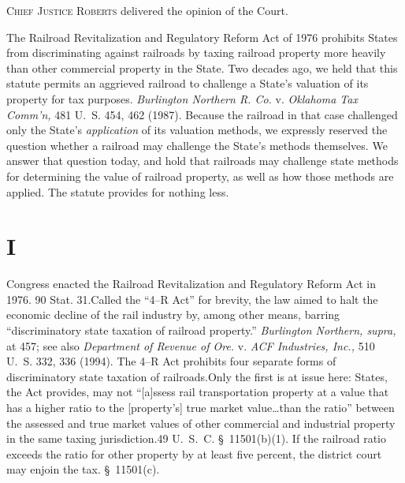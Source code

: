 
\setcounter{page}{12}

  \textsc{Chief Justice Roberts} delivered the opinion of the Court.

  The Railroad Revitalization and Regulatory Reform Act of 1976 prohibits States from discriminating against railroads by taxing railroad property more heavily than other commercial property in the State. Two decades ago, we held that this statute permits an aggrieved railroad to challenge a State's valuation of its property for tax purposes. \emph{Burlington Northern R. Co.} v. \emph{Oklahoma Tax Comm'n,} 481 U.~S. 454, 462 (1987). Because the railroad in that case challenged only the State's \emph{application} of its valuation methods, we expressly reserved the question whether a railroad may challenge the State's methods themselves. We answer that question today, and hold that railroads may challenge state methods for determining the value of railroad property, as well as how those methods are applied. The statute provides for nothing less.

\section{I}

  Congress enacted the Railroad Revitalization and Regulatory Reform Act in 1976. 90 Stat. 31.\footnotemark[1] Called the ``4--R Act'' for brevity, the law aimed to halt the economic decline of the rail industry by, among other means, barring ``discriminatory state taxation of railroad property.'' \emph{Burlington Northern, supra,} at 457; see also \emph{Department of Revenue of Ore.} v. \emph{ACF Industries, Inc.,} 510 U.~S. 332, 336 (1994). The 4--R Act prohibits four separate forms of discriminatory state taxation of railroads.\footnotemark[2] Only the first is at issue here: \newpage  States, the Act provides, may not ``[a]ssess rail transportation property at a value that has a higher ratio to the [property's] true market value\dots than the ratio'' between the assessed and true market values of other commercial and industrial property in the same taxing jurisdiction.49 U.~S.~C. \S~11501(b)(1). If the railroad ratio exceeds the ratio for other property by at least five percent, the district court may enjoin the tax. \S~11501(c).\footnotemark[3] \newpage 


